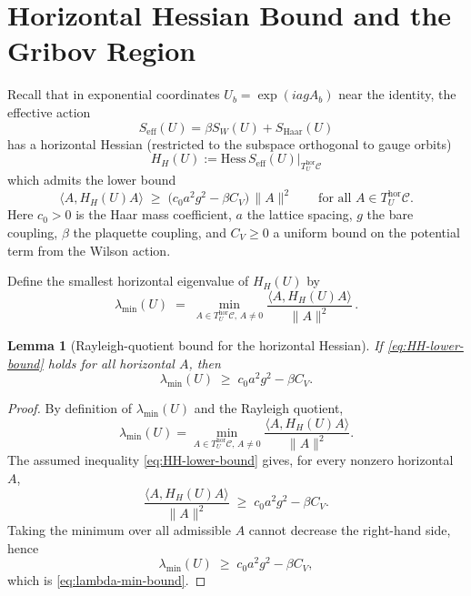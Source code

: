 \documentclass[11pt]{article}
\newtheorem{lemma}{Lemma}
\begin{document}
\section*{Horizontal Hessian Bound and the Gribov Region}

Recall that in exponential coordinates $U_b = \exp(i a g A_b)$ near the identity, the effective action
\begin{equation*}
S_{\mathrm{eff}}(U) = \beta S_W(U) + S_{\mathrm{Haar}}(U)
\end{equation*}
has a horizontal Hessian (restricted to the subspace orthogonal to gauge orbits)
\begin{equation*}
H_H(U) := \mathrm{Hess}\, S_{\mathrm{eff}}(U)\big|_{T^{\mathrm{hor}}_U \mathcal{C}}
\end{equation*}
which admits the lower bound
\begin{equation}
\label{eq:HH-lower-bound}
\langle A, H_H(U) A \rangle \;\ge\; \bigl(c_0 a^2 g^2 - \beta C_V\bigr)\,\|A\|^2
\qquad \text{for all } A \in T^{\mathrm{hor}}_U \mathcal{C}.
\end{equation}
Here $c_0 > 0$ is the Haar mass coefficient, $a$ the lattice spacing, $g$ the bare coupling, $\beta$ the plaquette coupling, and $C_V \ge 0$ a uniform bound on the potential term from the Wilson action.

Define the smallest horizontal eigenvalue of $H_H(U)$ by
\begin{equation*}
\lambda_{\min}(U) \;=\; \min_{A \in T^{\mathrm{hor}}_U \mathcal{C},\, A \neq 0}
\frac{\langle A, H_H(U) A \rangle}{\|A\|^2}\,.
\end{equation*}

\begin{lemma}[Rayleigh-quotient bound for the horizontal Hessian]
\label{lem:lambda-min-bound}
If \eqref{eq:HH-lower-bound} holds for all horizontal $A$, then
\begin{equation}
\label{eq:lambda-min-bound}
\lambda_{\min}(U) \;\ge\; c_0 a^2 g^2 - \beta C_V.
\end{equation}
\end{lemma}

\begin{proof}
By definition of $\lambda_{\min}(U)$ and the Rayleigh quotient,
\begin{equation*}
\lambda_{\min}(U)
= \min_{A \in T^{\mathrm{hor}}_U \mathcal{C},\, A \neq 0}
\frac{\langle A, H_H(U) A \rangle}{\|A\|^2}.
\end{equation*}
The assumed inequality \eqref{eq:HH-lower-bound} gives, for every nonzero horizontal $A$,
\begin{equation*}
\frac{\langle A, H_H(U) A \rangle}{\|A\|^2}
\;\ge\; c_0 a^2 g^2 - \beta C_V.
\end{equation*}
Taking the minimum over all admissible $A$ cannot decrease the right-hand side, hence
\begin{equation*}
\lambda_{\min}(U) \;\ge\; c_0 a^2 g^2 - \beta C_V,
\end{equation*}
which is \eqref{eq:lambda-min-bound}.
\end{proof}
\end{document}
